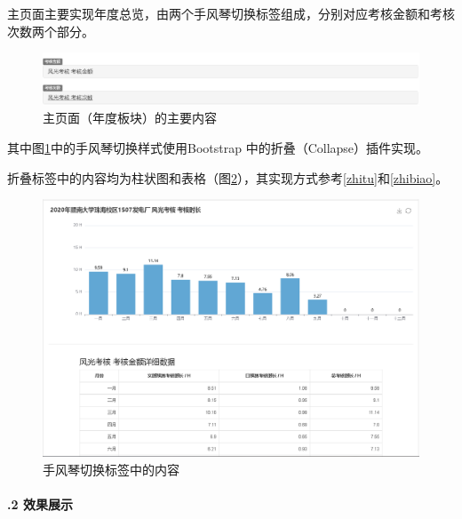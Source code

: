 \documentclass[winfonts,UTF8,a4paper]{ctexart}
\begin{document}
主页面主要实现年度总览，由两个手风琴切换标签组成，分别对应考核金额和考核次数两个部分。

\begin{figure}[H]
	\centering
	\includegraphics[width=0.7\linewidth]{pic/screenshot009}
	\caption{主页面（年度板块）的主要内容}
	\label{fig:screenshot009}
\end{figure}

其中图\ref{fig:screenshot009}中的手风琴切换样式使用Bootstrap 中的折叠（Collapse）插件实现。


折叠标签中的内容均为柱状图和表格（图\ref{fig:screenshot011}），其实现方式参考\ref{zhitu}和\ref{zhibiao}。

\begin{figure}[H]
	\centering
	\includegraphics[width=0.7\linewidth]{pic/screenshot011}
	\caption{手风琴切换标签中的内容}
	\label{fig:screenshot011}
\end{figure}
\paragraph{\thesubsubsection.2 效果展示}\ \\
\end{document}
